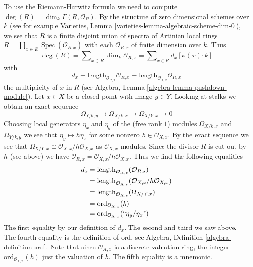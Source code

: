 \documentclass{stacks-project}
\theoremstyle{plain}
\theoremstyle{definition}
\theoremstyle{remark}
\numberwithin{equation}{subsection}
\def\Spec{\mathop{\mathrm{Spec}}}
\begin{document}
\medskip\noindent
To use the Riemann-Hurwitz formula we need to compute
$\deg(R) = \dim_k \Gamma(R, \mathcal{O}_R)$. By the structure
of zero dimensional schemes over $k$ (see for example
Varieties, Lemma \ref{varieties-lemma-algebraic-scheme-dim-0}),
we see that $R$ is a finite disjoint union of spectra of
Artinian local rings $R = \coprod_{x \in R} \Spec(\mathcal{O}_{R, x})$
with each $\mathcal{O}_{R, x}$ of finite dimension over $k$. Thus
$$
\deg(R) = \sum\nolimits_{x \in R} \dim_k \mathcal{O}_{R, x} =
\sum\nolimits_{x \in R} d_x [\kappa(x) : k]
$$
with
$$
d_x = \text{length}_{\mathcal{O}_{R, x}} \mathcal{O}_{R, x} =
\text{length}_{\mathcal{O}_{X, x}} \mathcal{O}_{R, x}
$$
the multiplicity of $x$ in $R$
(see Algebra, Lemma \ref{algebra-lemma-pushdown-module}).
Let $x \in X$ be a closed point with image $y \in Y$.
Looking at stalks we obtain an exact sequence
$$
\Omega_{Y/k, y} \to \Omega_{X/k, x} \to \Omega_{X/Y, x} \to 0
$$
Choosing local generators $\eta_x$ and $\eta_y$ of the
(free rank $1$) modules $\Omega_{X/k, x}$ and $\Omega_{Y/k, y}$
we see that
$
\eta_y \mapsto h \eta_x
$
for some nonzero $h \in \mathcal{O}_{X, x}$. By the exact sequence we see that
$\Omega_{X/Y, x} \cong \mathcal{O}_{X, x}/h\mathcal{O}_{X, x}$
as $\mathcal{O}_{X, x}$-modules. Since the divisor
$R$ is cut out by $h$ (see above) we have
$\mathcal{O}_{R, x} = \mathcal{O}_{X, x}/h\mathcal{O}_{X, x}$.
Thus we find the following equalities
\begin{align*}
d_x
& =
\text{length}_{\mathcal{O}_{X, x}}(\mathcal{O}_{R, x}) \\
& =
\text{length}_{\mathcal{O}_{X, x}}(\mathcal{O}_{X, x}/h\mathcal{O}_{X, x}) \\
& =
\text{length}_{\mathcal{O}_{X, x}}(\Omega_{X/Y, x}) \\
& =
\text{ord}_{\mathcal{O}_{X, x}}(h) \\
& =
\text{ord}_{\mathcal{O}_{X, x}}(``\eta_y/\eta_x")
\end{align*}
The first equality by our definition of $d_x$. The second and third
we saw above. The fourth equality is the definition of $\text{ord}$, see
Algebra, Definition \ref{algebra-definition-ord}. Note that since
$\mathcal{O}_{X, x}$ is a discrete valuation ring, the integer
$\text{ord}_{\mathcal{O}_{X, x}}(h)$ just the valuation of $h$.
The fifth equality is a mnemonic.
\end{document}

